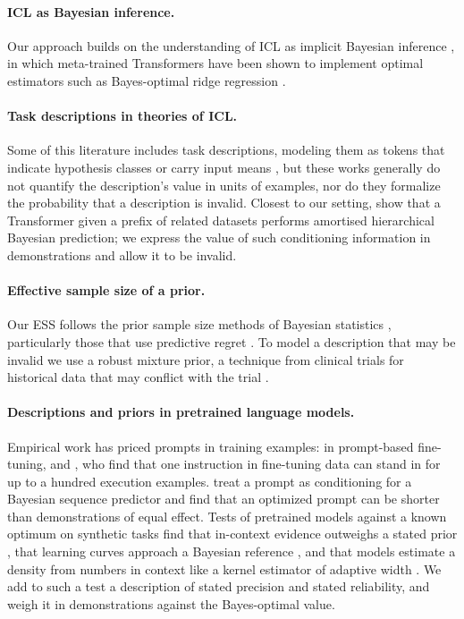 \documentclass{article}
\begin{document}
\paragraph{ICL as Bayesian inference.} Our approach builds on the understanding of ICL as implicit Bayesian inference \citep{xie2022}, in which meta-trained Transformers have been shown to implement optimal estimators such as Bayes-optimal ridge regression \citep{akyurek2023, raventos2023, panwar2024}.

\paragraph{Task descriptions in theories of ICL.} Some of this literature includes task descriptions, modeling them as tokens that indicate hypothesis classes or carry input means \citep{huangge2025, lin2025, tong2026, lin2024}, but these works generally do not quantify the description's value in units of examples, nor do they formalize the probability that a description is invalid. Closest to our setting, \citet{zhu2026} show that a Transformer given a prefix of related datasets performs amortised hierarchical Bayesian prediction; we express the value of such conditioning information in demonstrations and allow it to be invalid.

\paragraph{Effective sample size of a prior.} Our ESS follows the prior sample size methods of Bayesian statistics \citep{morita2008, reimherr2021, neuenschwander2020}, particularly those that use predictive regret \citep{reznik2026}. To model a description that may be invalid we use a robust mixture prior, a technique from clinical trials for historical data that may conflict with the trial \citep{schmidli2014}.

\paragraph{Descriptions and priors in pretrained language models.} Empirical work has priced prompts in training examples: \citet{lescao2021} in prompt-based fine-tuning, and \citet{cook2026}, who find that one instruction in fine-tuning data can stand in for up to a hundred execution examples. \citet{wenliang2025} treat a prompt as conditioning for a Bayesian sequence predictor and find that an optimized prompt can be shorter than demonstrations of equal effect. Tests of pretrained models against a known optimum on synthetic tasks find that in-context evidence outweighs a stated prior \citep{gupta2025}, that learning curves approach a Bayesian reference \citep{akata2026}, and that models estimate a density from numbers in context like a kernel estimator of adaptive width \citep{liu2025}. We add to such a test a description of stated precision and stated reliability, and weigh it in demonstrations against the Bayes-optimal value.
\end{document}
